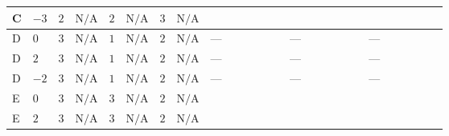 \documentclass[8pt]{article}
\begin{document}
\begin{landscape}
\begin{longtable}{@{}llcccccc >{\raggedright\arraybackslash}p{0.21\linewidth} >{\raggedright\arraybackslash}p{0.21\linewidth} >{\raggedright\arraybackslash}p{0.21\linewidth}@{}}
\midrule
C & $-3$ & $2$ & $\text{N/A}$ & $2$ & $\text{N/A}$ & $3$ & $\text{N/A}$ & \scriptsize\adjustbox{max width=\linewidth}{$\begin{gathered} +8 {\lambda_{12}^{(1)}} {\lambda_{12}^{(A)}}\end{gathered}$} & \scriptsize\adjustbox{max width=\linewidth}{$\begin{gathered} +2 {\lambda_{12}^{(A)}} {\lambda_{S_1}^{(1)}}\end{gathered}$} & \scriptsize\adjustbox{max width=\linewidth}{$\begin{gathered} +2 {\lambda_{12}^{(A)}} {\lambda_{S_2}^{(1)}}\end{gathered}$} \\
\midrule
D & $0$ & $3$ & $\text{N/A}$ & $1$ & $\text{N/A}$ & $2$ & $\text{N/A}$ & --- & --- & --- \\
\midrule
D & $2$ & $3$ & $\text{N/A}$ & $1$ & $\text{N/A}$ & $2$ & $\text{N/A}$ & --- & --- & --- \\
\midrule
D & $-2$ & $3$ & $\text{N/A}$ & $1$ & $\text{N/A}$ & $2$ & $\text{N/A}$ & --- & --- & --- \\
\midrule
E & $0$ & $3$ & $\text{N/A}$ & $3$ & $\text{N/A}$ & $2$ & $\text{N/A}$ & \scriptsize\adjustbox{max width=\linewidth}{$\begin{gathered} +8 {\lambda_{12}^{(1)}} {\lambda_{12}^{(A)}}\end{gathered}$} & \scriptsize\adjustbox{max width=\linewidth}{$\begin{gathered} +2 {\lambda_{12}^{(A)}} {\lambda_{S_1}^{(1)}}\end{gathered}$} & \scriptsize\adjustbox{max width=\linewidth}{$\begin{gathered} +2 {\lambda_{12}^{(A)}} {\lambda_{S_2}^{(1)}}\end{gathered}$} \\
\midrule
E & $2$ & $3$ & $\text{N/A}$ & $3$ & $\text{N/A}$ & $2$ & $\text{N/A}$ & \scriptsize\adjustbox{max width=\linewidth}{$\begin{gathered} +8 {\lambda_{12}^{(1)}} {\lambda_{12}^{(A)}}\end{gathered}$} & \scriptsize\adjustbox{max width=\linewidth}{$\begin{gathered} +2 {\lambda_{12}^{(A)}} {\lambda_{S_1}^{(1)}}\end{gathered}$} & \scriptsize\adjustbox{max width=\linewidth}{$\begin{gathered} +2 {\lambda_{12}^{(A)}} {\lambda_{S_2}^{(1)}}\end{gathered}$} \\

\end{longtable}
\end{landscape}
\end{document}
